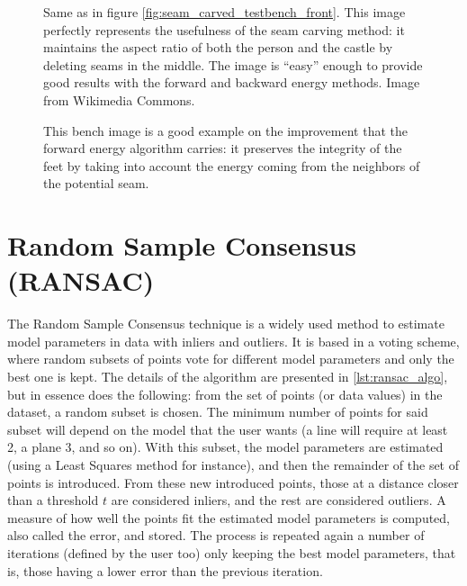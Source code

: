 \documentclass[../main.tex]{subfiles}
\begin{document}
\begin{figure}[htbp]
    \centering
    \caption{Same as in figure \ref{fig:seam_carved_testbench_front}. This image perfectly represents the usefulness of the seam carving method: it maintains the aspect ratio of both the person and the castle by deleting seams in the middle. The image is ``easy'' enough to provide good results with the forward and backward energy methods. Image from Wikimedia Commons.}
    \label{fig:seam_carved_castle}
\end{figure}

\begin{figure}[htbp]
    \centering
    \caption{This bench image is a good example on the improvement that the forward energy algorithm carries: it preserves the integrity of the feet by taking into account the energy coming from the neighbors of the potential seam.}
    \label{fig:seam_carved_bench}
\end{figure}


\section{Random Sample Consensus (RANSAC)} \label{sec:ransac}
The Random Sample Consensus \cite{ransac_paper81} technique is a widely used method to estimate model parameters in data with inliers and outliers. It is based in a voting scheme, where random subsets of points vote for different model parameters and only the best one is kept. The details of the algorithm are presented in \ref{lst:ransac_algo}, but in essence does the following: from the set of points (or data values) in the dataset, a random subset is chosen. The minimum number of points for said subset will depend on the model that the user wants (a line will require at least 2, a plane 3, and so on). With this subset, the model parameters are estimated (using a Least Squares method for instance), and then the remainder of the set of points is introduced. From these new introduced points, those at a distance closer than a threshold $t$ are considered inliers, and the rest are considered outliers. A measure of how well the points fit the estimated model parameters is computed, also called the error, and stored. The process is repeated again a number of iterations (defined by the user too) only keeping the best model parameters, that is, those having a lower error than the previous iteration.
\end{document}
